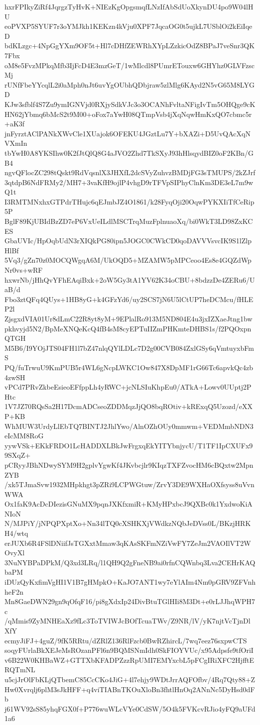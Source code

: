 hxrFPIkyZiRf4JqrgzTyHvK+NIEzKgOpgsmqfLNzIfAbSdUoXkynDU4po9W04lHU
eoPVXP5SYUF7r3oYMJkh1KEKzn4kVju0XPF7JqcaOG0t5ujkL7USblOi2kEiIqeD
bdKLzgc+4NpGgYXm9OF5t+Hl7cDHfZEWRhXYpLZzkicOdZ8BPaJ7veSnr3QK7Fbx
oM8e5FvzMPkqMfb3IjFcD4E3mzGeT/1wMlcdl8PUmrETouxw6GHYhz0GLVFzscMj
rUNfFbeYYcqlL2i0aMph0nJt6uvYgOUbhQDbjraw5zlMlg6KAyd2N5vG65M8LYGD
KJw3sfblf4S7Zu9ymIGNVjd0RXjySdkVJc3o3OCANhFvltaNFigIvTm5OHQge9cK
HN62jYbmq6bMcS2t9M00+oFox7aYwH08QTmpVsb4jXqNqwHmKxQO7cbmc5r+aK3f
jnFyrztAClPANkXWvCle1XUajok6OFEKU4JGztLu7Y+bXAZi+D5UvQAcXqNVXmIn
tbYwH0A8YKSIhw0K2fJtQlQ8G4aJVO2Zhd7TkSXyJ93hHlsqydBIZ0oF2KBn/GB4
ngvQFlocZC298tQskt9RdVqsnlX3JHXfL2dcSVyZuhvzBMDjFG3sTMUPS/2kZJrf
3qtdpB6NdFRMy2/MH7+3vaKfH9ojlP4vhgD9rTFVpSIPhyClnKm3DE3eL7m9wQ1t
I3RMTMNxhxGTPdrTHujc6qEJmbJZ4O1861/k28FyqOji20OqwPYKXIiTfCeRip5P
BglF89KjUBIdBzZD7eP6VxUeILdlMSCTrqMuzFplnuaoXq/bi0WkT3LD98ZxKCES
GbaUVIc/HpOqbUdN3rXIQkPG80ipn5JOGC0CWkCD0qoDAVVVsvcIK9S1lZlpHlBf
5Vq3/gZn70z0MOCQWgqA6M/UkOQD5+MZAMW5pMPCeoo4Es8e4GQZdWpNr0vs+wRF
hxwrNb/jHhQvYFhEAqiBxk+2oW5Gy3tA1YV62K34oCBU+8bdzzDe4ZERu6/UaB/d
Fbo3ztQFq4QUys+1HB8yG+k4GFzYd6/uy2SCS7jN6U5lCtUP7heDCMcu/fHLEP2l
ZjsgxdVIA01Ur8dLmC22R8yt8yM+9EPlalRo913M5ND804E4u3jxIZXaeJtng1bw
pkhvyjd5N2/BpMeXNQeKcQ4fB4sM8cyEPTuIIZmPHKmteDHBS1s/f2PQOxpnQTGH
M5B6/I9YOjJTS04FH1l7bZ47nlqQYlLDLc7D2g00CVB084ZxlGSy6qVmtuyxbFmS
PQ/fuTrwuU9KmPUB5r4WL6gNcpLWKC1Ow847X8DpMF1rG66Tc6apvkQc4zb4zwSH
vPCd7PRvZkbeEsieoEFfppLh4yRWC+jcNLSIuKhpEu0/ATkA+Lowv0UUptj2PHtc
1V7JZ70RQsSa2H17DcmADCseoZDDMqzJjQO8bqROtiv+kRExqQ5Uzozd/eXXP+KB
WhMUW3UrdyLlEbTQ7BINTJ2JhlYwo/AlnOZhOUy0mmwm+VEDMmbNDN3eIcMM8RoG
yywVSk+EKkFRDO1LcHADDXLBkJwFrgxqEkYITYbnjycU/T1TF1IpCXUFx99SXqZ+
pCRyyJBhNDwySYM9H2gplvYgwKf4JKvbcjlr9KIqzTXFZvocHM6cBQxtw2MpnZYB
/xk5TJmaSvw1932MHpkhgt3pZRi9LCPWGtuw/ZrvY3DE9WXHaOXfsyss8uVvnWWA
Ox1faK9AcDcDIezisGNuMX9pqnJXKfxmiR+KMyHPxbcJ9QXBc0k1YxdwoKiANIoN
N/MJPiY/jNPQPXptXo+Nn34lTQ0cXSHKXjVWdkzNQbJeDVss0L/BKzjHRKH4/wtq
erJUXb6R4FSlDNiifJsTGXxtMmaw3qKAsSKFmNZiVwFY7ZeJm2VAOIlVT2WOvyXl
3NuNYBPaDPkM/Q3xd3LRq/l1QH9Q2gFneNB9ai0rfnCQWnbq3Lva2CEHrKAQbaPM
iDUzQyKxfimVgHI1V1B7gHMpkO+KaJO7ANT1wy7eYlAIm4Nm0pGRV9ZFVnhheF2n
Mn8GaeDWN29gn9qOfqF16/pi8gXdxIp24DivBtuTGlHIi8M3Dt+e0rLJJhqWPH7c
/qMmis9ZyMNHEaXz9fLc3ToTVIWJcBOfTcuaTWv/Z9NR/lV/yK7njtVcTjnDlXfY
ecmyJiFJ+4guZ/9fK5RRtu/dZRlZ136RlFzcb0BwRZhircL/7wq7eez76sxpwCTS
soqyFUrlaBkXEJeMsROzanPFl6n9BQMSNmIdh0SkFIOYVUc/x95Adpsfe9tfOriI
v6B22W0KHBaWZ+GTTXbKFADPZzzRpUMI7EMYxcbL5pFCgIRiXFC2HjfftERQTmNL
u5cjJrOlFbKLjQTbemC85CcCKo4JiG+4l7ehjy9WDtJrrAQFOfbv/4Rq7Qty88+Z
Hw0Xvrqlj6plM3sJkHFF+q4viTIABnTKOuXloBn3fhtlHnOq2ANnNc5DyHsd0dFb
j61WV92sS85yhqFGX0f+P776wuWLcVYe0CdSW/5O4k5FVKcvRJio4yFQ9aUFd1a6
